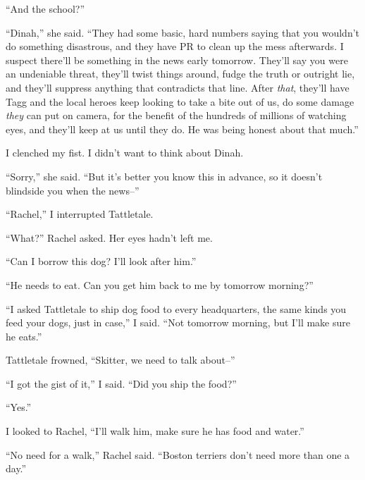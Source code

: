 ``And the school?''



``Dinah,'' she said.  ``They had some basic, hard numbers saying that you wouldn't do something disastrous, and they have PR to clean up the mess afterwards.  I suspect there'll be something in the news early tomorrow.  They'll say you were an undeniable threat, they'll twist things around, fudge the truth or outright lie, and they'll suppress anything that contradicts that line.  After \emph{that}, they'll have Tagg and the local heroes keep looking to take a bite out of us, do some damage \emph{they} can put on camera, for the benefit of the hundreds of millions of watching eyes, and they'll keep at us until they do.  He was being honest about that much.''



I clenched my fist.  I didn't want to think about Dinah.



``Sorry,'' she said.  ``But it's better you know this in advance, so it doesn't blindside you when the news--''



``Rachel,'' I interrupted Tattletale.



``What?''  Rachel asked.  Her eyes hadn't left me.



``Can I borrow this dog?  I'll look after him.''



``He needs to eat.  Can you get him back to me by tomorrow morning?''



``I asked Tattletale to ship dog food to every headquarters, the same kinds you feed your dogs, just in case,'' I said.  ``Not tomorrow morning, but I'll make sure he eats.''



Tattletale frowned, ``Skitter, we need to talk about--''



``I got the gist of it,'' I said.  ``Did you ship the food?''



``Yes.''



I looked to Rachel, ``I'll walk him, make sure he has food and water.''



``No need for a walk,'' Rachel said.  ``Boston terriers don't need more than one a day.''



